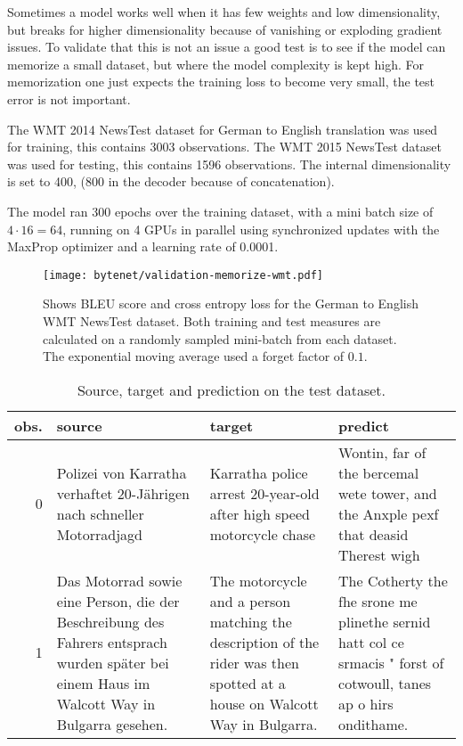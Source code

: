 Sometimes a model works well when it has few weights and low dimensionality, but breaks for higher dimensionality because of vanishing or exploding gradient issues. To validate that this is not an issue a good test is to see if the model can memorize a small dataset, but where the model complexity is kept high. For memorization one just expects the training loss to become very small, the test error is not important.

The WMT 2014 NewsTest dataset for German to English translation was used for training, this contains 3003 observations. The WMT 2015 NewsTest dataset was used for testing, this contains 1596 observations. The internal dimensionality is set to 400, (800 in the decoder because of concatenation).

The model ran 300 epochs over the training dataset, with a mini batch size of $4 \cdot 16 = 64$, running on 4 GPUs in parallel using synchronized updates with the MaxProp optimizer and a learning rate of 0.0001.

\begin{figure}[h]
    \centering
    \texttt{[image: bytenet/validation-memorize-wmt.pdf]}
    \caption{Shows BLEU score and cross entropy loss for the German to English WMT NewsTest dataset. Both training and test measures are calculated on a randomly sampled mini-batch from each dataset. The exponential moving average used a forget factor of $0.1$.}
    \label{fig:result:bytenet:wmt}
\end{figure}

\begin{table}[h]
\centering
\begin{tabular}{r|p{3.3cm} p{3.3cm} p{3.3cm}}
	obs. & source & target & predict\\ \hline
  0 & Polizei von Karratha verhaftet 20-Jährigen nach schneller Motorradjagd & Karratha police arrest 20-year-old after high speed motorcycle chase & Wontin, far of the bercemal wete tower, and the Anxple pexf that deasid Therest wigh \\
  1 & Das Motorrad sowie eine Person, die der Beschreibung des Fahrers entsprach wurden später bei einem Haus im Walcott Way in Bulgarra gesehen. & The motorcycle and a person matching the description of the rider was then spotted at a house on Walcott Way in Bulgarra. & The Cotherty the fhe srone me plinethe sernid hatt col ce srmacis " forst of cotwoull, tanes ap o hirs ondithame.
\end{tabular}
\caption{Source, target and prediction on the test dataset.}
\label{table:result:bytenet:wmt-test}
\end{table}

